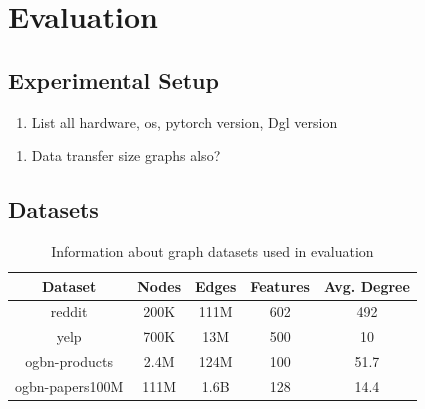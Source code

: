 \chapter{Evaluation} \label{Evaluation}


\section{Experimental Setup}
\begin{enumerate}
    \item List all hardware, os, pytorch version, Dgl version
\end{enumerate}

\begin{enumerate}
    \item Data transfer size graphs also?
\end{enumerate}

\section{Datasets}

\begin{table}[h!]
    \begin{center}
        \begin{tabular}{|c c c c c|} 
        \hline
        \textbf{Dataset} & \textbf{Nodes} & \textbf{Edges} & \textbf{Features} & \textbf{Avg. Degree} \\ [0.5ex] 
        \hline\hline
        reddit & 200K & 111M & 602 & 492 \\
        \hline
        yelp & 700K & 13M & 500 & 10 \\
        \hline
        ogbn-products & 2.4M & 124M & 100 & 51.7 \\
        \hline
        ogbn-papers100M & 111M & 1.6B & 128 & 14.4 \\
        \hline
        \end{tabular}
    \end{center}
    \caption{
        Information about graph datasets used in evaluation
    }
    \label{Eval: Dataset info}
\end{table}


